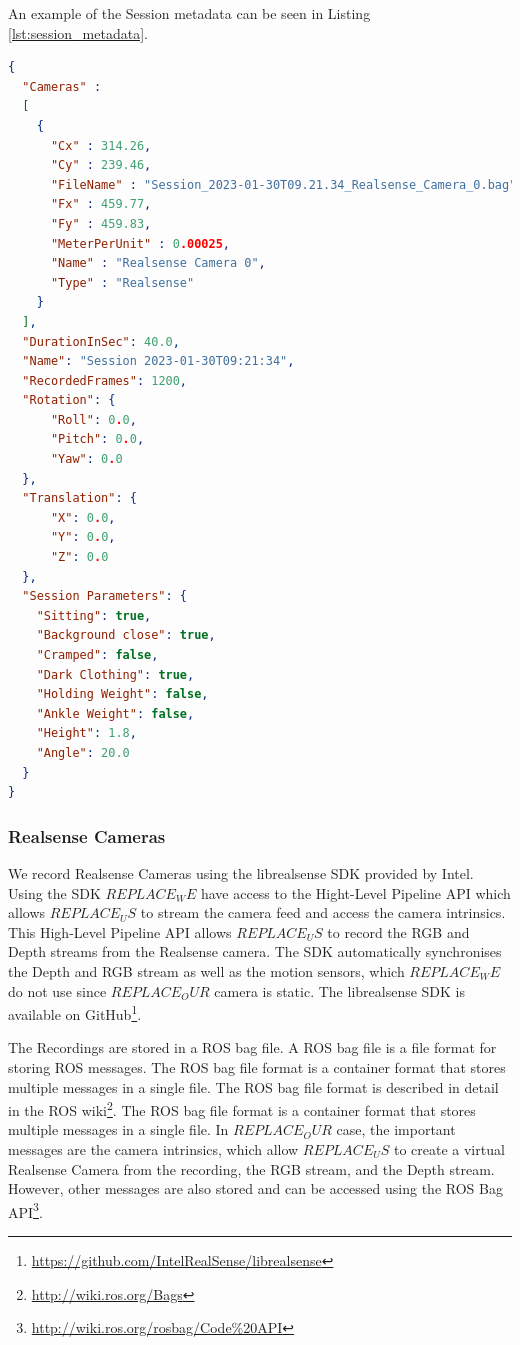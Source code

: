 An example of the Session metadata can be seen in Listing \ref{lst:session_metadata}.

\begin{lstlisting}[language=json,
                   firstnumber=1,
                   caption={[Example of session metadata]{Example of the Session metadata with a single Realsense Camera which was recorded for 40 seconds at around 30 frames per second resulting in 1200 frames. Some values have been changed to increase readability.}},
                   label={lst:session_metadata}]
{
  "Cameras" : 
  [
    {
      "Cx" : 314.26,
      "Cy" : 239.46,
      "FileName" : "Session_2023-01-30T09.21.34_Realsense_Camera_0.bag",
      "Fx" : 459.77,
      "Fy" : 459.83,
      "MeterPerUnit" : 0.00025,
      "Name" : "Realsense Camera 0",
      "Type" : "Realsense"
    }
  ],
  "DurationInSec": 40.0,
  "Name": "Session 2023-01-30T09:21:34",
  "RecordedFrames": 1200,
  "Rotation": {
      "Roll": 0.0,
      "Pitch": 0.0,
      "Yaw": 0.0
  },
  "Translation": {
      "X": 0.0,
      "Y": 0.0,
      "Z": 0.0
  },
  "Session Parameters": {
    "Sitting": true,
    "Background close": true,
    "Cramped": false,
    "Dark Clothing": true,
    "Holding Weight": false,
    "Ankle Weight": false,
    "Height": 1.8,
    "Angle": 20.0
  }
}
\end{lstlisting}

\subsubsection{Realsense Cameras}

We record Realsense Cameras using the librealsense SDK provided by Intel. Using the SDK $REPLACE_WE$ have access to the Hight-Level Pipeline API which allows $REPLACE_US$ to stream the camera feed and access the camera intrinsics. This High-Level Pipeline API allows $REPLACE_US$ to record the RGB and Depth streams from the Realsense camera. The SDK automatically synchronises the Depth and RGB stream as well as the motion sensors, which $REPLACE_WE$ do not use since $REPLACE_OUR$ camera is static. The librealsense SDK is available on GitHub\footnote{\url{https://github.com/IntelRealSense/librealsense}}.

The Recordings are stored in a ROS bag file. A ROS bag file is a file format for storing ROS messages. The ROS bag file format is a container format that stores multiple messages in a single file. The ROS bag file format is described in detail in the ROS wiki\footnote{\url{http://wiki.ros.org/Bags}}. The ROS bag file format is a container format that stores multiple messages in a single file. In $REPLACE_OUR$ case, the important messages are the camera intrinsics, which allow $REPLACE_US$ to create a virtual Realsense Camera from the recording, the RGB stream, and the Depth stream. However, other messages are also stored and can be accessed using the ROS Bag API\footnote{\url{http://wiki.ros.org/rosbag/Code\%20API}}.

